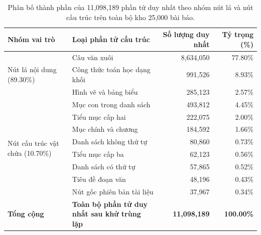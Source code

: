\begin{table}[H]
    \centering
    \footnotesize
    \renewcommand{\arraystretch}{1.22}
    \begin{tabularx}{\textwidth}{l X r r}
        \toprule
        \textbf{Nhóm vai trò} & \textbf{Loại phần tử cấu trúc} & \textbf{Số lượng duy nhất} & \textbf{Tỷ trọng (\%)} \\
        \midrule
        \multirow{3}{*}{Nút lá nội dung (89.30\%)}
            & Câu văn xuôi & 8,634,050 & 77.80\% \\
            & Công thức toán học dạng khối & 991,526 & 8.93\% \\
            & Hình vẽ và bảng biểu & 285,123 & 2.57\% \\
        \midrule
        \multirow{8}{*}{Nút cấu trúc vật chứa (10.70\%)}
            & Mục con trong danh sách & 493,812 & 4.45\% \\
            & Tiểu mục cấp hai & 222,075 & 2.00\% \\
            & Mục chính và chương & 184,592 & 1.66\% \\
            & Danh sách không thứ tự & 80,860 & 0.73\% \\
            & Tiểu mục cấp ba & 62,123 & 0.56\% \\
            & Danh sách có thứ tự & 57,865 & 0.52\% \\
            & Tiêu đề đoạn văn & 48,196 & 0.43\% \\
            & Nút gốc phiên bản tài liệu & 37,967 & 0.34\% \\
        \midrule
        \textbf{Tổng cộng} & \textbf{Toàn bộ phần tử duy nhất sau khử trùng lặp} & \textbf{11,098,189} & \textbf{100.00\%} \\
        \bottomrule
    \end{tabularx}
    \caption{Phân bố thành phần của 11,098,189 phần tử duy nhất theo nhóm nút lá và nút cấu trúc trên toàn bộ kho 25,000 bài báo.}
    \label{tab:m2_kind_dist}
\end{table}

